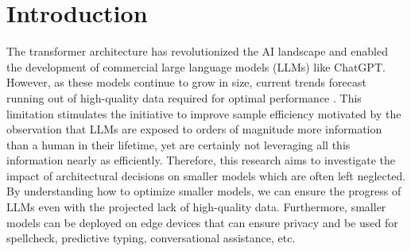 
\section{Introduction} %
\label{sec:introduction}



The transformer architecture \cite{Vaswani2017} has revolutionized the AI landscape and enabled the development of commercial large language models (LLMs) like ChatGPT. However, as these models continue to grow in size, current trends forecast running out of high-quality data required for optimal performance \cite{Villalobos2022}. This limitation stimulates the initiative to improve sample efficiency motivated by the observation that LLMs are exposed to orders of magnitude more information than a human in their lifetime, yet are certainly not leveraging all this information nearly as efficiently. Therefore, this research aims to investigate the impact of architectural decisions on smaller models which are often left neglected. By understanding how to optimize smaller models, we can ensure the progress of LLMs even with the projected lack of high-quality data. Furthermore, smaller models can be deployed on edge devices that can ensure privacy and be used for spellcheck, predictive typing, conversational assistance, etc.

